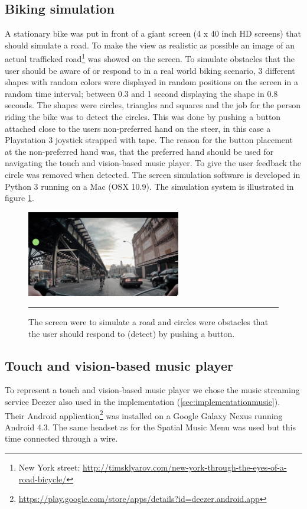 \subsection{Biking simulation}
A stationary bike was put in front of a giant screen (4 x 40 inch HD screens) that should simulate a road. To make the view as realistic as possible an image of an actual trafficked road\footnote{New York street: \url{http://timsklyarov.com/new-york-through-the-eyes-of-a-road-bicycle/}} was showed on the screen. To simulate obstacles that the user should be aware of or respond to in a real world biking scenario, 3 different shapes with random colors were displayed in random positions on the screen in a random time interval; between 0.3 and 1 second displaying the shape in 0.8 seconds. The shapes were circles, triangles and squares and the job for the person riding the bike was to detect the circles. This was done by pushing a button attached close to the users non-preferred hand on the steer, in this case a Playstation 3 joystick strapped with tape. The reason for the button placement at the non-preferred hand was, that the preferred hand should be used for navigating the touch and vision-based music player. To give the user feedback the circle was removed when detected. The screen simulation software is developed in Python 3 running on a Mac (OSX 10.9). The simulation system is illustrated in figure \ref{fig:simulationsystem}.

\begin{figure}[h]
	\centering
		\includegraphics[width=0.6\textwidth,height=\textheight,keepaspectratio]{./Figures/simulation_system.png}
		\rule{35em}{1pt}
	\caption[Simulation screen]{The screen were to simulate a road and circles were obstacles that the user should respond to (detect) by pushing a button.}
	\label{fig:simulationsystem}
\end{figure}

\subsection{Touch and vision-based music player}
To represent a touch and vision-based music player we chose the music streaming service Deezer also used in the implementation (\ref{sec:implementationmusic}). Their Android application\footnote{\url{https://play.google.com/store/apps/details?id=deezer.android.app}} was installed on a Google Galaxy Nexus running Android 4.3. The same headset as for the Spatial Music Menu was used but this time connected through a wire.

